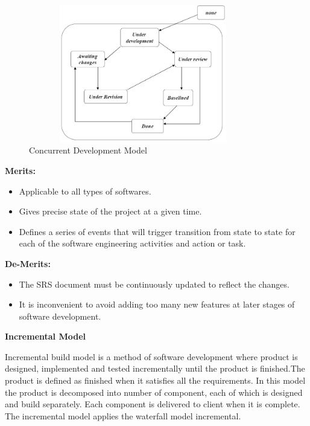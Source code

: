 \documentclass{article}
\begin{document}
\begin{figure}
  \includegraphics[width=10cm, height=6cm]{fig5.jpg}
  \caption{Concurrent Development Model }
  
\end{figure}
\textbf{Merits:}
\begin{itemize}
    

\item 	Applicable to all types of softwares.
\item 	Gives precise state of the project at a given time.
\item 	Defines a series of events that will trigger transition from state to state for each of the software engineering activities and action or task.
\end{itemize}
\textbf{De-Merits:}
\begin{itemize}
\item 	The SRS document must be continuously updated to reflect the changes.
\item 	It is inconvenient to avoid adding too many new features at later stages of software development.
\end{itemize}
\vspace{0.5cm}
\large{\textbf{Incremental Model}}

Incremental build model is a method of software development where product is designed, implemented and tested incrementally until the product is finished.The product is defined  as finished when it satisfies all the requirements. In this model the product is decomposed into number of component, each of which is designed and build separately. Each component is delivered to client when it is complete. The incremental model applies the waterfall model incremental. \\
 
\end{document}
